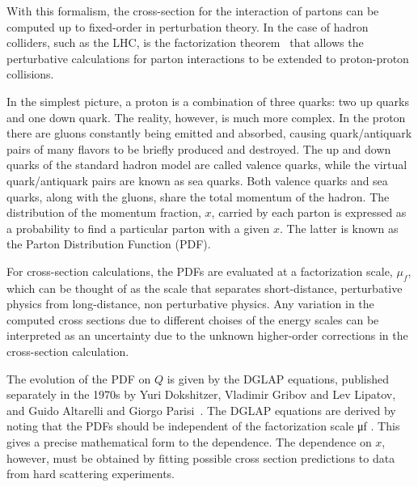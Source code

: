 With this formalism, the cross-section for the interaction of partons can be computed up to fixed-order in perturbation theory. In the case of hadron colliders, such as the LHC, is the factorization theorem~\cite{Collins:1989gx} that allows the perturbative calculations for parton interactions to be extended to proton-proton collisions.


In the simplest picture, a proton is a combination of three quarks: two up quarks and one down quark. The reality, however, is much more complex. In the proton there are gluons constantly being emitted and absorbed, causing quark/antiquark pairs of many flavors to be briefly produced and destroyed. The up and down quarks of the standard hadron model are called valence quarks, while the virtual quark/antiquark pairs are known as sea quarks. Both valence quarks and sea quarks, along with the gluons, share the total momentum of the hadron.
 The distribution of the momentum fraction, $x$, carried by each parton is expressed as a probability to find a particular parton with a given $x$. The latter is known as the Parton Distribution Function (PDF).


For cross-section calculations, the PDFs are evaluated at a factorization scale, $\mu_f$, which can be thought of as the scale that separates short-distance, perturbative physics from long-distance, non perturbative physics.
Any variation in the computed cross sections due to different choises of the energy scales can be interpreted as an uncertainty due to the unknown higher-order corrections in the cross-section  calculation.


The evolution of the PDF on $Q$ is given by the DGLAP equations, published separately in the 1970s by Yuri Dokshitzer, Vladimir Gribov and Lev Lipatov, and Guido Altarelli and Giorgo Parisi~\cite{Altarelli1977298}. The DGLAP equations are derived by noting that the PDFs should be independent of the factorization scale μf . This gives a precise mathematical form to the dependence.  The dependence on $x$, however, must be obtained by fitting possible cross section predictions to data from hard scattering experiments.


